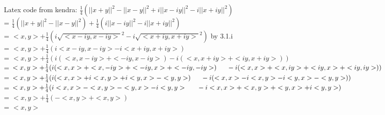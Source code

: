 \documentclass[12pt]{article}
\newenvironment{problem}[2][Problem]{\begin{trivlist}
\item[\hskip \labelsep {\bfseries #1}\hskip \labelsep {\bfseries #2.}]}{\end{trivlist}}
\theoremstyle{definition}
\theoremstyle{definition}
\theoremstyle{definition}
\theoremstyle{definition}
\begin{document}
\begin{problem}{3.2}
Latex code from kendra:
$\frac{1}{4} (||x+y||^2 - ||x-y||^2 + i ||x-iy||^2 - i ||x+iy||^2)$ \\ 
= $\frac{1}{4} (||x+y||^2 - ||x-y||^2)  + \frac{1}{4} (i ||x-iy||^2 - i ||x+iy||^2)$ \\
= $<x,y> + \frac{1}{4} (i\sqrt{<x-iy, x-iy>}^2 - i \sqrt{<x+iy, x+iy>}^2)$ by 3.1.i\\
= $<x,y> + \frac{1}{4} (i<x-iy, x-iy> - i<x+iy, x+iy>)$ \\
= $<x,y> + \frac{1}{4} (i(<x, x-iy> + <-iy, x-iy>) - i(<x, x+iy> +<iy, x+iy>))$ \\
= $<x,y> + \frac{1}{4} (i(<x, x> + <x, -iy> + <-iy, x> + <-iy,-iy>) \\ \indent - i(<x, x> +< x, iy> +<iy, x> +<iy, iy>))$ \\
= $<x,y> + \frac{1}{4} (i(<x, x> + i<x, y> + i<y, x> - <y,y>) \\ \indent - i(<x, x> -i < x, y> -i <y, x> -<y, y>))$ \\
= $<x,y> + \frac{1}{4} (i<x, x> -<x, y> -<y, x> - i<y,y> \\ \indent - i<x, x> + < x, y> + <y, x> +i<y, y>)$ \\
= $<x,y> + \frac{1}{4} ( -<x,y>  + < x, y>)  $ \\
= $<x,y>$ \\
\end{problem}
\end{document}
